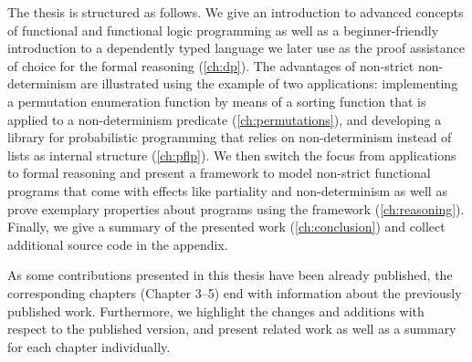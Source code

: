 The thesis is structured as follows. We give an introduction to advanced concepts of functional and functional logic programming as well as a beginner\--friendly introduction to a dependently typed language we later use as the proof assistance of choice for the formal reasoning (\autoref{ch:dp}).
The advantages of non\--strict non\--determinism are illustrated using the example of two applications: implementing a permutation enumeration function by means of a sorting function that is applied to a non\--determinism predicate (\autoref{ch:permutations}), and developing a library for probabilistic programming that relies on non\--determinism instead of lists as internal structure (\autoref{ch:pflp}).
We then switch the focus from applications to formal reasoning and present a framework to model non\--strict functional programs that come with effects like partiality and non\--determinism as well as prove exemplary properties about programs using the framework (\autoref{ch:reasoning}).
Finally, we give a summary of the presented work (\autoref{ch:conclusion}) and collect additional source code in the appendix.

As some contributions presented in this thesis have been already published, the corresponding chapters (Chapter 3--5) end with information about the previously published work.
Furthermore, we highlight the changes and additions with respect to the published version, and present related work as well as a summary for each chapter individually.